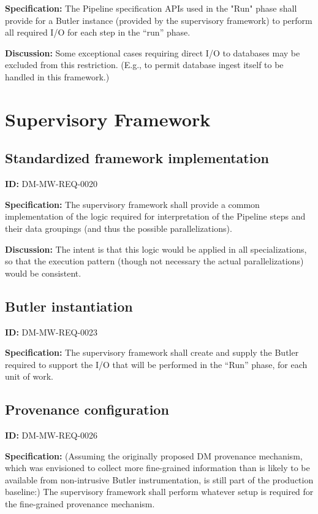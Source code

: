 \documentclass[SE,toc,lsstdraft]{lsstdoc}
\begin{document}
\textbf{Specification:}
The Pipeline specification APIs used in the "Run" phase shall provide for a Butler instance (provided by the supervisory framework) to perform all required I/O for each step in the “run” phase.

\textbf{Discussion:}
Some exceptional cases requiring direct I/O to databases may be excluded from this restriction. (E.g., to permit database ingest itself to be handled in this framework.)

\section{Supervisory Framework}

\subsection{Standardized framework implementation}

\label{DM-MW-REQ-0020}
\textbf{ID:} DM-MW-REQ-0020

\textbf{Specification:}
The supervisory framework shall provide a common implementation of the logic required for interpretation of the Pipeline steps and their data groupings (and thus the possible parallelizations).

\textbf{Discussion:}
The intent is that this logic would be applied in all specializations, so that the execution pattern (though not necessary the actual parallelizations) would be consistent.

\subsection{Butler instantiation}

\label{DM-MW-REQ-0023}
\textbf{ID:} DM-MW-REQ-0023

\textbf{Specification:}
The supervisory framework shall create and supply the Butler required to support the I/O that will be performed in the “Run” phase, for each unit of work.

\subsection{Provenance configuration}

\label{DM-MW-REQ-0026}
\textbf{ID:} DM-MW-REQ-0026

\textbf{Specification:}
(Assuming the originally proposed DM provenance mechanism, which was envisioned to collect more fine-grained information than is likely to be available from non-intrusive Butler instrumentation, is still part of the production baseline:) The supervisory framework shall perform whatever setup is required for the fine-grained provenance mechanism.
\end{document}
